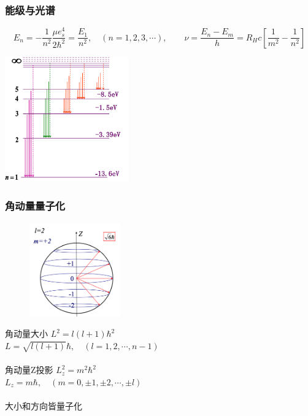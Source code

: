 \begin{frame}
	  \frametitle{能级与光谱}
	  \[ E_n = - \frac{1}{n^2} \frac{\mu e^4 _s }{2 \hbar ^2} =\frac{E_1}{n^2}, \quad (n=1,2,3,\cdots) , \qquad \nu=\frac{E_n -E_m}{h} = R_H c [\frac{1}{m^2} -\frac{1}{n^2}]
	  \]
	  \begin{center}
		   \includegraphics[width=0.40\textwidth]{figs/spectra.png}
	  \end{center}
\end{frame}

\begin{frame} 
    \frametitle{角动量量子化}
    \begin{figure} %
        \includegraphics[width=0.35\textwidth]{figs/LandL2.png}   
    \end{figure}
    {\Bullet} 角动量大小  $L^2=l(l+1) \hbar^2$\\
	$L=\sqrt{l(l+1)}\hbar, \quad (l=1,2,\cdots, n-1)$\\
    ~~\\ \vspace{0.3em}
    {\Bullet} 角动量Z投影 $L^2_z=m^2\hbar^2$\\
    $L_z=m\hbar, \quad (m=0,\pm 1,\pm 2, \cdots, \pm l)$\\
	~~\\
    {\Bullet} 大小和方向皆量子化
\end{frame} 

